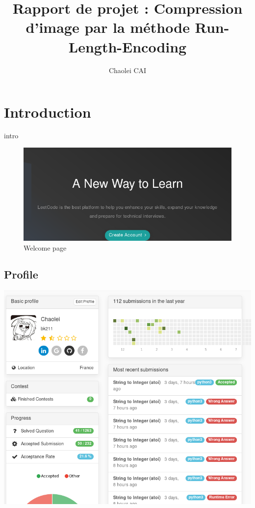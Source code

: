 \documentclass[12pt, letterpaper]{article}
\title{Rapport de projet : Compression d'image par la méthode Run-Length-Encoding}
\author{Chaolei CAI}
\begin{document}
\begin{titlepage}
    \maketitle
\end{titlepage}

\tableofcontents
\section{Introduction}
intro

\begin{figure}
    \includegraphics[width=\linewidth]{img/L1.png}
    \caption{Welcome page}
    \label{fig:L1}
\end{figure}

\subsection{Profile}
\includegraphics[width=\linewidth]{img/L6.png}
\end{document}
